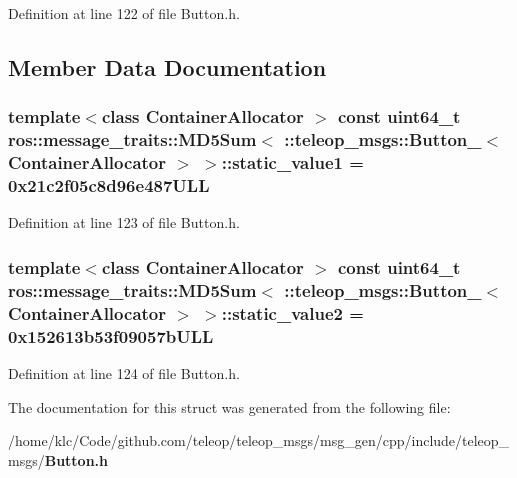 Definition at line 122 of file Button.h.



\subsection{Member Data Documentation}
\subsubsection[{static\_\-value1}]{\setlength{\rightskip}{0pt plus 5cm}template$<$class ContainerAllocator $>$ const uint64\_\-t ros::message\_\-traits::MD5Sum$<$ ::{\bf teleop\_\-msgs::Button\_\-}$<$ ContainerAllocator $>$ $>$::{\bf static\_\-value1} = 0x21c2f05c8d96e487ULL\hspace{0.3cm}{\ttfamily  [static]}}\label{structros_1_1message__traits_1_1MD5Sum_3_01_1_1teleop__msgs_1_1Button___3_01ContainerAllocator_01_4_01_4_a57b83abc070f26399721199c879a7a6a}


Definition at line 123 of file Button.h.

\subsubsection[{static\_\-value2}]{\setlength{\rightskip}{0pt plus 5cm}template$<$class ContainerAllocator $>$ const uint64\_\-t ros::message\_\-traits::MD5Sum$<$ ::{\bf teleop\_\-msgs::Button\_\-}$<$ ContainerAllocator $>$ $>$::{\bf static\_\-value2} = 0x152613b53f09057bULL\hspace{0.3cm}{\ttfamily  [static]}}\label{structros_1_1message__traits_1_1MD5Sum_3_01_1_1teleop__msgs_1_1Button___3_01ContainerAllocator_01_4_01_4_ab711075d727a088d4108e601b46e0a09}


Definition at line 124 of file Button.h.



The documentation for this struct was generated from the following file:\begin{DoxyCompactItemize}
\item 
/home/klc/Code/github.com/teleop/teleop\_\-msgs/msg\_\-gen/cpp/include/teleop\_\-msgs/{\bf Button.h}\end{DoxyCompactItemize}
